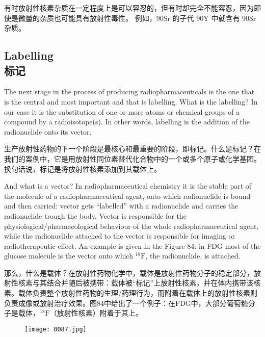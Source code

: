 \documentclass[dvipsnames, svgnames,a4paper,11pt]{article}
\begin{document}
有时放射性核素杂质在一定程度上是可以容忍的，但有时却完全不能容忍，因为即使是微量的杂质也可能具有放射性毒性。 例如，90Sr 的子代 90Y 中就含有 90Sr 杂质。

\subsection{Labelling \\标记}

The next stage in the process of producing radiopharmaceuticals is the one that is
the central and most important and that is labelling. What is the labelling? In our
case it is the substitution of one or more atoms or chemical groups of a compound
by a radioisotope(s). In other words, labelling is the addition of the radionuclide onto
its vector.

生产放射性药物的下一个阶段是最核心和最重要的阶段，即标记。什么是标记？在我们的案例中，它是用放射性同位素替代化合物中的一个或多个原子或化学基团。换句话说，标记是将放射性核素添加到其载体上。

And what is a vector? In radiopharmaceutical chemistry it is the stable part of the
molecule of a radiopharmaceutical agent, onto which radionuclide is bound and then
carried: vector gets “labelled” with a radionuclide and carries the radionuclide trough the body. Vector is responsible for the physiological/pharmacological behaviour of
the whole radiopharmaceutical agent, while the radionuclide attached to the vector is
responsible for imaging or radiotherapeutic effect. An example is given in the Figure
84: in FDG most of the glucose molecule is the vector onto which ${}^{18}\mathrm{F}$, the
radionuclide, is attached.

那么，什么是载体？在放射性药物化学中，载体是放射性药物分子的稳定部分，放射性核素与其结合并随后被携带：载体被“标记”上放射性核素，并在体内携带该核素。载体负责整个放射性药物的生理/药理行为，而附着在载体上的放射性核素则负责成像或放射治疗效果。图84中给出了一个例子：在FDG中，大部分葡萄糖分子是载体，${}^{18}\mathrm{F}$（放射性核素）附着于其上。

\begin{figure}[H]
    \centering
    \texttt{[image: 0087.jpg]}
     \label{fig84}
\end{figure}
\end{document}
